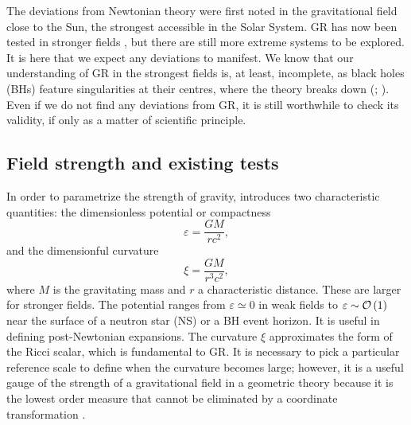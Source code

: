 The deviations from Newtonian theory were first noted in the gravitational field close to the Sun, the strongest accessible in the Solar System. GR has now been tested in stronger fields \citep{Will2006}, but there are still more extreme systems to be explored. It is here that we expect any deviations to manifest. We know that our understanding of GR in the strongest fields is, at least, incomplete, as black holes (BHs) feature singularities at their centres, where the theory breaks down (\citealt[section 34.6]{Misner1973}; \citealt[chapter 9]{Wald1984}). Even if we do not find any deviations from GR, it is still worthwhile to check its validity, if only as a matter of scientific principle.

\subsection{Field strength and existing tests}

In order to parametrize the strength of gravity, \citet{Psaltis2008a} introduces two characteristic quantities: the dimensionless potential or compactness \citep{Yunes2013}
\begin{equation}
\varepsilon = \frac{GM}{rc^2},
\end{equation}
and the dimensionful curvature
\begin{equation}
\xi = \frac{GM}{r^3c^2},
\end{equation}
where $M$ is the gravitating mass and $r$ a characteristic distance. These are larger for stronger fields. The potential ranges from $\varepsilon \simeq 0$ in weak fields to $\varepsilon \sim \mathcal{O}\left({1}\right)$ near the surface of a neutron star (NS) or a BH event horizon. It is useful in defining post-Newtonian expansions. The curvature $\xi$ approximates the form of the Ricci scalar, which is fundamental to GR. It is necessary to pick a particular reference scale to define when the curvature becomes large; however, it is a useful gauge of the strength of a gravitational field in a geometric theory because it is the lowest order measure that cannot be eliminated by a coordinate transformation \citep[chapter 7]{Hobson2006}.

